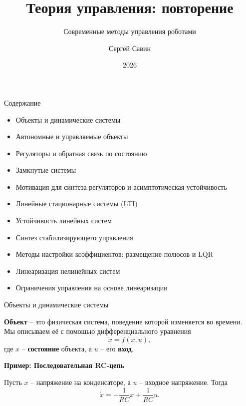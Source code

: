 \documentclass{beamer}
\subtitle{Современные методы управления роботами}
\author{Сергей Савин}
\date{2026}
\title{Теория управления: повторение}
\begin{document}
	\maketitle
	
	\begin{frame}{Содержание}
		\begin{itemize}
			\item Объекты и динамические системы
			\item Автономные и управляемые объекты
			\item Регуляторы и обратная связь по состоянию
			\item Замкнутые системы
			\item Мотивация для синтеза регуляторов и асимптотическая устойчивость
			\item Линейные стационарные системы (LTI)
			\item Устойчивость линейных систем
			\item Синтез стабилизирующего управления
			\item Методы настройки коэффициентов: размещение полюсов и LQR
			\item Линеаризация нелинейных систем
			\item Ограничения управления на основе линеаризации
		\end{itemize}
	\end{frame}
	
	\begin{frame}{Объекты и динамические системы}
		\begin{flushleft}
			
			\textbf{Объект} -- это физическая система, поведение которой изменяется во времени.
			Мы описываем её с помощью дифференциального уравнения
			\[
			\dot{x}=f(x,u),
			\]
			где \(x\) -- \textbf{состояние} объекта, а \(u\) -- его \textbf{вход}.
			
			\bigskip
			
			{
				
				\textbf{Пример: Последовательная RC-цепь}
				
				Пусть \(x\) -- напряжение на конденсаторе, а \(u\) -- входное напряжение.
				Тогда
				\[
				\dot{x}=-\frac{1}{RC}x+\frac{1}{RC}u.
				\]
			}
		\end{flushleft}
	\end{frame}
	
\end{document}
